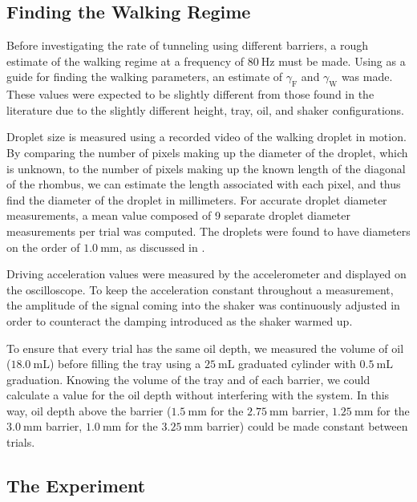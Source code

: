 \subsection{Finding the Walking Regime}

Before investigating the rate of tunneling using different barriers, a rough estimate of the walking regime at a frequency of $80~\mathrm{Hz}$ must be made. Using  as a guide for finding the walking parameters, an estimate of $\gamma_\mathrm{F}$ and $\gamma_\mathrm{W}$ was made. These values were expected to be slightly different from those found in the literature due to the slightly different height, tray, oil, and shaker configurations.

Droplet size is measured using a recorded video of the walking droplet in motion. By comparing the number of pixels making up the diameter of the droplet, which is unknown, to the number of pixels making up the known length of the diagonal of the rhombus, we can estimate the length associated with each pixel, and thus find the diameter of the droplet in millimeters. For accurate droplet diameter measurements, a mean value composed of 9 separate  droplet diameter measurements per trial was computed. The droplets were found to have diameters on the order of $1.0~\mathrm{mm}$, as discussed in . 

Driving acceleration values were measured by the accelerometer and displayed on the oscilloscope. To keep the acceleration constant throughout a measurement, the amplitude of the signal coming into the shaker was continuously adjusted in order to counteract the damping introduced as the shaker warmed up.

To ensure that every trial has the same oil depth, we measured the volume of oil ($18.0~\mathrm{mL}$) before filling the tray using a $25~\mathrm{mL}$ graduated cylinder with $0.5~\mathrm{mL}$ graduation. Knowing the volume of the tray and of each barrier, we could calculate a value for the oil depth without interfering with the system. In this way, oil depth above the barrier ($1.5~\mathrm{mm}$ for the $2.75~\mathrm{mm}$ barrier, $1.25~\mathrm{mm}$ for the $3.0~\mathrm{mm}$ barrier, $1.0~\mathrm{mm}$ for the $3.25~\mathrm{mm}$ barrier) could be made constant between trials. 

\subsection{The Experiment}

